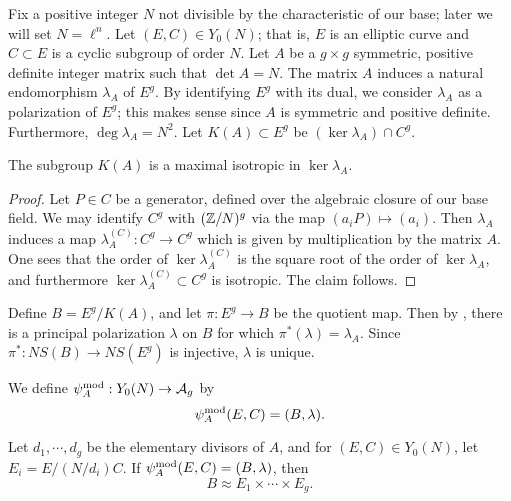 \documentclass{amsart}
\begin{document}
Fix a positive integer $N$ not divisible by the characteristic of our base; later we will set $N = \ell^n$. Let $(E, C) \in Y_0(N)$; that is, $E$ is an elliptic curve and $C \subset E$ is a cyclic subgroup of order $N$. Let $A$ be a $g \times g$ symmetric, positive definite integer matrix such that $\det A = N$. The matrix $A$ induces a natural endomorphism $\lambda_A$ of $E^g$. By identifying $E^g$ with its dual, we consider $\lambda_A$ as a polarization of $E^g$; this makes sense since $A$ is symmetric and positive definite. Furthermore, $\deg \lambda_A = N^2$. Let $K(A) \subset E^g$ be $(\ker \lambda_A) \cap C^g$.

\begin{lemma}
  The subgroup $K(A)$ is a maximal isotropic in $\ker \lambda_A$.
\end{lemma}

\begin{proof}
  Let $P \in C$ be a generator, defined over the algebraic closure of our base field. We may identify $C^g$ with $(\mathbb{Z}/N)^g$ via the map $(a_iP) \mapsto (a_i)$. Then $\lambda_A$ induces a map $\lambda_A^{(C)}:C^g \to C^g$ which is given by multiplication by the matrix $A$. One sees that the order of $\ker \lambda_A^{(C)}$ is the square root of the order of $\ker \lambda_A$, and furthermore $\ker \lambda_A^{(C)} \subset C^g$ is isotropic. The claim follows.
\end{proof}

Define $B = E^g/K(A)$, and let $\pi: E^g \to B$ be the quotient map. Then by \cite[Prop. 16.8]{milne-av}, there is a principal polarization $\lambda$ on $B$ for which $\pi^*(\lambda) = \lambda_A$. Since $\pi^*: NS(B) \to NS(E^g)$ is injective, $\lambda$ is unique.

We define $\psi_{A}^\mathrm{mod}: Y_0(N) \to \mathcal{A}_g$ by
\[
  \psi_{A}^\mathrm{mod}(E,C) = (B,\lambda).
\]


\begin{proposition}\label{prop:psimod-weakly-isomorphic-to-product}
  Let $d_1, \cdots, d_g$ be the elementary divisors of $A$, and for $(E,C) \in Y_0(N)$, let $E_i = E/(N/d_i)C$. If $\psi_{A}^\mathrm{mod}(E,C) = (B,\lambda)$, then
  \[
    B \approx E_1 \times \cdots \times E_g.
  \]
\end{proposition}
\end{document}
